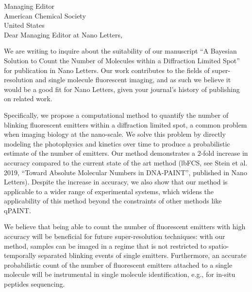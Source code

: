 \documentclass{article}
\date{\today}
\begin{document}
\thispagestyle{empty}
Managing Editor\\
American Chemical Society\\
United States\\

\vspace{5mm}
Dear Managing Editor at Nano Letters,


We are writing to inquire about the suitability of our manuscript
``A Bayesian Solution to Count the Number of Molecules within a Diffraction Limited Spot''
for publication in Nano Letters. 
%
%
Our work contributes to the fields of super-resolution and single molecule
fluorescent imaging, and as such we believe it would be a good fit for Nano
Letters, given your journal's history of publishing on related work.
%

Specifically, we propose a computational method to quantify the number of
blinking fluorescent emitters within a diffraction limited spot, a common
problem when imaging biology at the nano-scale.
%
We solve this problem by directly modeling the photophysics and kinetics over
time to produce a probabilistic estimate of the number of emitters.
%
Our method demonstrates a 2-fold increase in accuracy compared to the current
state of the art method (lbFCS, see Stein et al. 2019, ``Toward Absolute
Molecular Numbers in DNA-PAINT'', published in Nano Letters). Despite the
increase in accuracy, we also show that our method is applicable to a wider
range of experimental systems, which widens the applicability of this method
beyond the constraints of other methods like qPAINT.

We believe that being able to count the number of fluorescent emitters with
high accuracy will be beneficial for future super-resolution techniques: with
our method, samples can be imaged in a regime that is not restricted to
spatio-temporally separated blinking events of single emitters. Furthermore, an
accurate probabilistic count of the number of fluorescent emitters attached to
a single molecule will be instrumental in single molecule identification, e.g.,
for in-situ peptides sequencing.
\end{document}
